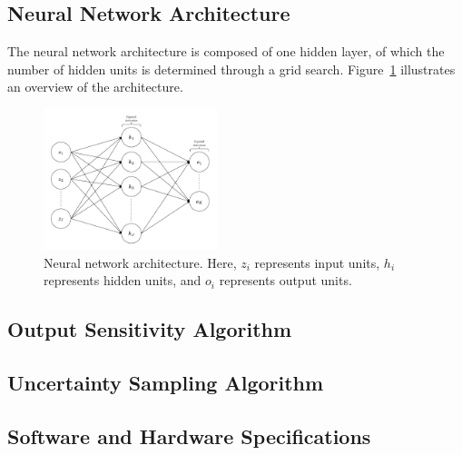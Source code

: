 \documentclass[10pt, conference]{IEEEtran}
\begin{document}
\subsection{Neural Network Architecture}
The neural network architecture is composed of one hidden layer, of which the number of hidden units is determined through a grid search. Figure~\ref{fig:nnarch} illustrates an overview of the architecture.

\begin{figure}[htbp]
	\centering
	\includegraphics[width=0.45\textwidth]{images/NNarch.pdf}
	\caption{Neural network architecture. Here, $z_i$ represents input units, $h_i$ represents hidden units, and $o_i$ represents output units.}
	\label{fig:nnarch}
\end{figure}


\subsection{Output Sensitivity Algorithm}

\subsection{Uncertainty Sampling Algorithm}

\subsection{Software and Hardware Specifications}
\end{document}
